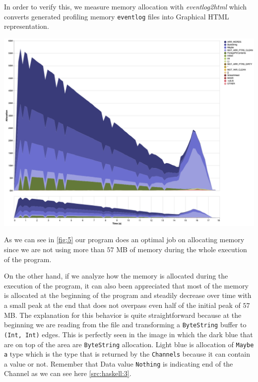 \documentclass[preprint]{elsarticle}
\begin{document}
In order to verify this, we measure memory allocation with \textit{eventlog2html} \cite{eventlog2html} which converts generated profiling memory \texttt{eventlog} files into Graphical HTML representation. 

\begin{minipage}[t]{\linewidth}
  \includegraphics[width=\textwidth]{visualization}
  \captionsetup{type=figure}
  \label{fig:5}
\end{minipage}

As we can see in \autoref{fig:5} our program does an optimal job on allocating memory since we are not using more than $57$ MB of memory during the whole execution of the program.

On the other hand, if we analyze how the memory is allocated during the execution of the program, it can also been appreciated that most of the memory is allocated at the beginning of the program and steadily decrease over time with a small peak at the end that does not overpass even half of the initial peak of $57$ MB. The explanation for this behavior is quite straightforward because at the beginning we are reading from the file and transforming a \texttt{ByteString} buffer to \texttt{(Int, Int)} edges. This is perfectly seen in the image in which the dark blue that are on top of the area are \texttt{ByteString} allocation. Light blue is allocation of \texttt{Maybe a} type which is the type that is returned by the \texttt{Channels} because it can contain a value or not. Remember that Data value \texttt{Nothing} is indicating end of the Channel as we can see here \autoref{src:haskell:3}.
\end{document}
